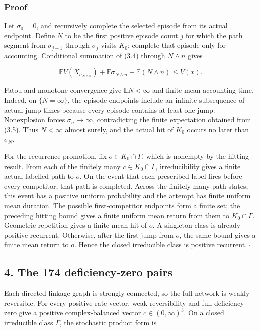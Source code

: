 \subsubsection{Proof}

Let \(\sigma_0=0\), and recursively complete the selected episode from
its actual endpoint. Define \(N\) to be the first positive episode count
\(j\) for which the path segment from \(\sigma_{j-1}\) through
\(\sigma_j\) visits \(K_0\); complete that episode only for accounting.
Conditional summation of (3.4) through \(N\wedge n\) gives

\[
 \mathbb E V(X_{\sigma_{N\wedge n}})
 +\mathbb E\sigma_{N\wedge n}
 +\mathbb E(N\wedge n)\le V(x).                     \tag{3.5}
\]

Fatou and monotone convergence give \(\mathbb EN<\infty\) and finite
mean accounting time. Indeed, on \(\{N=\infty\}\), the episode endpoints
include an infinite subsequence of actual jump times because every
episode contains at least one jump. Nonexplosion forces
\(\sigma_n\to\infty\), contradicting the finite expectation obtained
from (3.5). Thus \(N<\infty\) almost surely, and the actual hit of
\(K_0\) occurs no later than \(\sigma_N\).

For the recurrence promotion, fix \(o\in K_0\cap\Gamma\), which is
nonempty by the hitting result. From each of the finitely many
\(c\in K_0\cap\Gamma\), irreducibility gives a finite actual labelled
path to \(o\). On the event that each prescribed label fires before
every competitor, that path is completed. Across the finitely many path
states, this event has a positive uniform probability and the attempt
has finite uniform mean duration. The possible first-competitor
endpoints form a finite set; the preceding hitting bound gives a finite
uniform mean return from them to \(K_0\cap\Gamma\). Geometric repetition
gives a finite mean hit of \(o\). A singleton class is already positive
recurrent. Otherwise, after the first jump from \(o\), the same bound
gives a finite mean return to \(o\). Hence the closed irreducible class
is positive recurrent. \(\square\)

\subsection{4. The 174 deficiency-zero
pairs}

Each directed linkage graph is strongly connected, so the full network
is weakly reversible. For every positive rate vector, weak reversibility
and full deficiency zero give a positive complex-balanced vector
\(c\in(0,\infty)^3\). On a closed irreducible class \(\Gamma\), the
stochastic product form is

